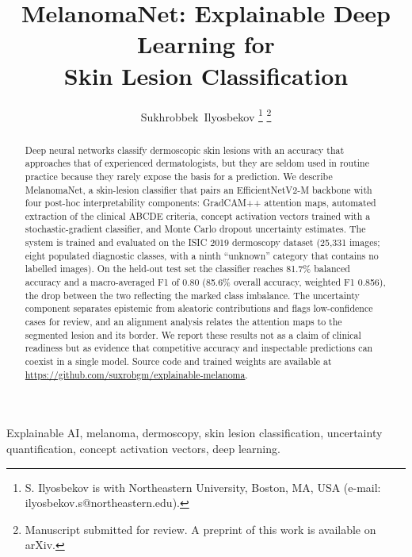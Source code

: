 \documentclass[journal]{IEEEtran}
\begin{document}
\title{MelanomaNet: Explainable Deep Learning for\\ Skin Lesion Classification}

\author{Sukhrobbek~Ilyosbekov%
    \thanks{S. Ilyosbekov is with Northeastern University, Boston, MA, USA
        (e-mail: ilyosbekov.s@northeastern.edu).}%
    \thanks{Manuscript submitted for review. A preprint of this work is
        available on arXiv.}%
}


\maketitle

\begin{abstract}
    Deep neural networks classify dermoscopic skin lesions with an accuracy that
    approaches that of experienced dermatologists, but they are seldom used in
    routine practice because they rarely expose the basis for a prediction. We
    describe MelanomaNet, a skin-lesion classifier that pairs an EfficientNetV2-M
    backbone with four post-hoc interpretability components: GradCAM++ attention
    maps, automated extraction of the clinical ABCDE criteria, concept activation
    vectors trained with a stochastic-gradient classifier, and Monte Carlo dropout
    uncertainty estimates. The system is trained and evaluated on the ISIC 2019
    dermoscopy dataset (25,331 images; eight populated diagnostic classes, with a
    ninth ``unknown'' category that contains no labelled images). On the held-out
    test set the classifier reaches 81.7\% balanced accuracy and a macro-averaged
    F1 of 0.80 (85.6\% overall accuracy, weighted F1 0.856), the drop between the
    two reflecting the marked class imbalance. The uncertainty component separates
    epistemic from aleatoric contributions and flags low-confidence cases for
    review, and an alignment analysis relates the attention maps to the segmented
    lesion and its border. We report these results not as a claim of clinical
    readiness but as evidence that competitive accuracy and inspectable predictions
    can coexist in a single model. Source code and trained weights are available at
    \url{https://github.com/suxrobgm/explainable-melanoma}.
\end{abstract}

\begin{IEEEkeywords}
    Explainable AI, melanoma, dermoscopy, skin lesion classification,
    uncertainty quantification, concept activation vectors, deep learning.
\end{IEEEkeywords}

\IEEEpeerreviewmaketitle










\end{document}
